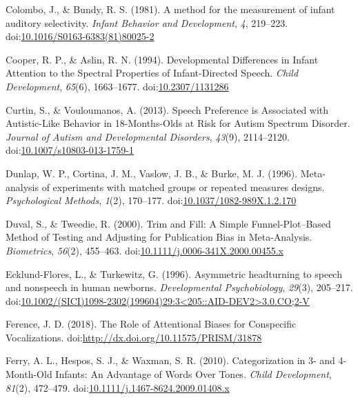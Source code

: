 \documentclass[man]{apa6}
\begin{document}
\hypertarget{ref-colombo_method_1981}{}
Colombo, J., \& Bundy, R. S. (1981). A method for the measurement of
infant auditory selectivity. \emph{Infant Behavior and Development},
\emph{4}, 219--223.
doi:\href{https://doi.org/10.1016/S0163-6383(81)80025-2}{10.1016/S0163-6383(81)80025-2}

\hypertarget{ref-cooper_developmental_1994}{}
Cooper, R. P., \& Aslin, R. N. (1994). Developmental Differences in
Infant Attention to the Spectral Properties of Infant-Directed Speech.
\emph{Child Development}, \emph{65}(6), 1663--1677.
doi:\href{https://doi.org/10.2307/1131286}{10.2307/1131286}

\hypertarget{ref-curtin_speech_2013}{}
Curtin, S., \& Vouloumanos, A. (2013). Speech Preference is Associated
with Autistic-Like Behavior in 18-Months-Olds at Risk for Autism
Spectrum Disorder. \emph{Journal of Autism and Developmental Disorders},
\emph{43}(9), 2114--2120.
doi:\href{https://doi.org/10.1007/s10803-013-1759-1}{10.1007/s10803-013-1759-1}

\hypertarget{ref-dunlap_meta-analysis_1996}{}
Dunlap, W. P., Cortina, J. M., Vaslow, J. B., \& Burke, M. J. (1996).
Meta-analysis of experiments with matched groups or repeated measures
designs. \emph{Psychological Methods}, \emph{1}(2), 170--177.
doi:\href{https://doi.org/10.1037/1082-989X.1.2.170}{10.1037/1082-989X.1.2.170}

\hypertarget{ref-duval_trim_2000}{}
Duval, S., \& Tweedie, R. (2000). Trim and Fill: A Simple
Funnel-Plot--Based Method of Testing and Adjusting for Publication Bias
in Meta-Analysis. \emph{Biometrics}, \emph{56}(2), 455--463.
doi:\href{https://doi.org/10.1111/j.0006-341X.2000.00455.x}{10.1111/j.0006-341X.2000.00455.x}

\hypertarget{ref-ecklund-flores_asymmetric_1996}{}
Ecklund-Flores, L., \& Turkewitz, G. (1996). Asymmetric headturning to
speech and nonspeech in human newborns. \emph{Developmental
Psychobiology}, \emph{29}(3), 205--217.
doi:\href{https://doi.org/10.1002/(SICI)1098-2302(199604)29:3\%3C205::AID-DEV2\%3E3.0.CO;2-V}{10.1002/(SICI)1098-2302(199604)29:3\textless{}205::AID-DEV2\textgreater{}3.0.CO;2-V}

\hypertarget{ref-ference_role_2018}{}
Ference, J. D. (2018). The Role of Attentional Biases for Conspecific
Vocalizations.
doi:\href{https://doi.org/http://dx.doi.org/10.11575/PRISM/31878}{http://dx.doi.org/10.11575/PRISM/31878}

\hypertarget{ref-ferry_categorization_2010}{}
Ferry, A. L., Hespos, S. J., \& Waxman, S. R. (2010). Categorization in
3- and 4-Month-Old Infants: An Advantage of Words Over Tones.
\emph{Child Development}, \emph{81}(2), 472--479.
doi:\href{https://doi.org/10.1111/j.1467-8624.2009.01408.x}{10.1111/j.1467-8624.2009.01408.x}
\end{document}
